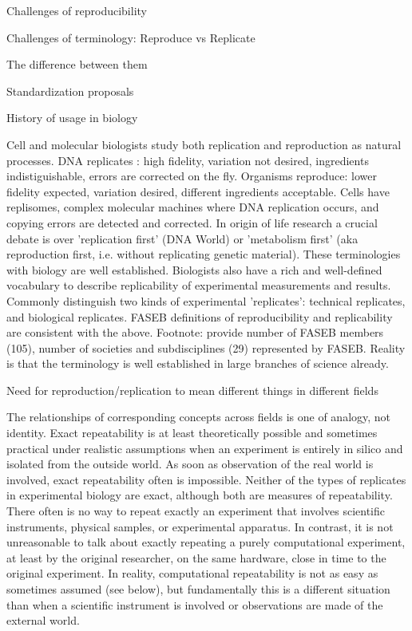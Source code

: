 Challenges of reproducibility

	Challenges of terminology: Reproduce vs Replicate

		The difference between them

		Standardization proposals

		History of usage in biology

			Cell and molecular biologists study both replication and reproduction as natural processes.
			DNA replicates :  high fidelity, variation not desired, ingredients indistiguishable, errors are corrected on the fly.
			Organisms reproduce:  lower fidelity expected, variation desired, different ingredients acceptable.
			Cells have replisomes, complex molecular machines where DNA replication occurs, and copying errors are detected and corrected.
			In origin of life research a crucial debate is over 'replication first' (DNA World) or 
 					'metabolism first' (aka reproduction first, i.e. without replicating genetic material).
			These terminologies with biology are well established.
			Biologists also have a rich and well-defined vocabulary to describe replicability of experimental measurements and results.
			Commonly distinguish two kinds of experimental 'replicates':  technical replicates, and biological replicates.
			FASEB definitions of reproducibility and replicability are consistent with the above.
			Footnote: provide number of FASEB members (105), number of societies and subdisciplines (29) represented by FASEB.
 			Reality is that the terminology is well established in large branches of science already.

		Need for reproduction/replication to mean different things in different fields

			The relationships of corresponding concepts across fields is one of analogy, not identity.
			Exact repeatability is at least theoretically possible and sometimes practical under realistic assumptions when an experiment 
				is entirely in silico and isolated from the outside world.
			As soon as observation of the real world is involved, exact repeatability often is impossible.
			Neither of the types of replicates in experimental biology are exact, although both are measures of repeatability.
			There often is no way to repeat exactly an experiment that involves scientific instruments, physical samples, or experimental apparatus.
			In contrast, it is not unreasonable to talk about exactly repeating a purely computational experiment, at least by the original researcher,
				on the same hardware, close in time to the original experiment.
			In reality, computational repeatability is not as easy as sometimes assumed (see below), but fundamentally this is
				a different situation than when a scientific instrument is involved or observations are made of the external world.

